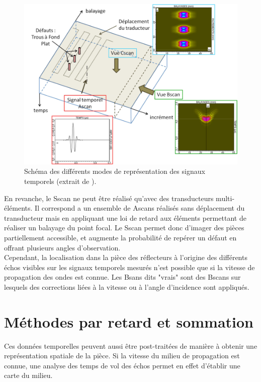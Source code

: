 
\begin{figure}
	\centering
	\includegraphics[scale=0.7]{img/scan2.png}
	\caption{\label{scan2} Schéma des différents modes de représentation des signaux temporels (extrait de \cite{bannouf}).}
\end{figure}

En revanche, le Sscan ne peut être réalisé qu'avec des transducteurs multi-éléments. Il correspond a un ensemble de Ascans réalisés sans déplacement du transducteur mais en appliquant une loi de retard aux éléments permettant de réaliser un balayage du point focal. Le Sscan permet donc d'imager des pièces partiellement accessible, et augmente la probabilité de repérer un défaut en offrant plusieurs angles d'observation.\\

Cependant, la localisation dans la pièce des réflecteurs à l'origine des différents échos visibles sur les signaux temporels mesurés n'est possible que si la vitesse de propagation des ondes est connue. Les Bsans dits "vrais" sont des Bscans sur lesquels des corrections liées à la vitesse ou à l'angle d'incidence sont appliqués.


\section{Méthodes par retard et sommation}
Ces données temporelles peuvent aussi être post-traitées de manière à obtenir une représentation spatiale de la pièce. Si la vitesse du milieu de propagation est connue, une analyse des temps de vol des échos permet en effet d'établir une carte du milieu. \\

